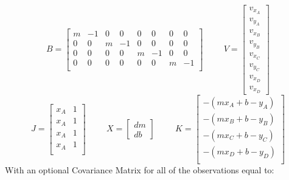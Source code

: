 \[
B = 
\begin{bmatrix}
m &  -1 &  0 &  0 &  0 &  0 &  0 &  0 \\
0 &  0 &  m &  -1 &  0 &  0 &  0 &  0 \\
0 &  0 &  0 &  0 &  m &  -1 &  0 &  0 \\
0 &  0 &  0 &  0 &  0 &  0 &  m &  -1 \\ 
\end{bmatrix}
\hspace{1cm}
V = 
\begin{bmatrix}
v_{x_A} \\ v_{y_A} \\ v_{x_B} \\ v_{y_B} \\ v_{x_C} \\ v_{y_C} \\ v_{x_D} \\ v_{x_D}
\end{bmatrix}
\]
\[
J =
\begin{bmatrix}
x_A & 1 \\
x_A & 1 \\
x_A & 1 \\
x_A & 1 \\
\end{bmatrix}
\hspace{1cm}
X =
\begin{bmatrix}
dm \\ db
\end{bmatrix}
\hspace{1cm}
K = 
\begin{bmatrix}
- (mx_A+b-y_A) \\
- (mx_B+b-y_B) \\
- (mx_C+b-y_C) \\
- (mx_D+b-y_D) \\
\end{bmatrix}
\]
With an optional Covariance Matrix for all of the observations equal to:
